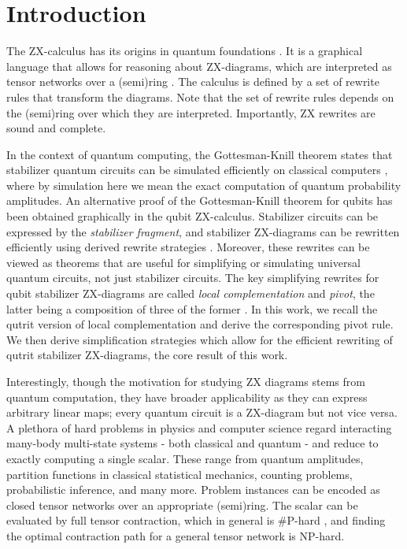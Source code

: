 \section{Introduction}



The ZX-calculus has its origins in
quantum foundations \cite{Coecke2011,vandewetering2020zxcalculus}.
It is a graphical language that allows for reasoning about ZX-diagrams,
which are interpreted as tensor networks over
a (semi)ring \cite{wang2020completeness}.
The calculus
is defined by a set of rewrite rules
that transform the diagrams.
Note that the set of rewrite rules depends on
the (semi)ring over which they are interpreted.
Importantly, ZX rewrites are sound and complete.


In the context of quantum computing,
the Gottesman-Knill theorem states that stabilizer quantum
circuits can be
simulated efficiently on classical computers \cite{Aaronson2004},
where by simulation here we mean the exact computation of quantum probability amplitudes.
An alternative
proof of the Gottesman-Knill theorem for qubits has been obtained graphically in the qubit ZX-calculus.
Stabilizer circuits can be expressed by the \emph{stabilizer
fragment},
and stabilizer ZX-diagrams can be rewritten efficiently
using derived rewrite strategies \cite{graph_theoretic_simplification}.
Moreover, these rewrites can be viewed as theorems
that are useful for simplifying or simulating universal quantum circuits, not just stabilizer circuits.
The key simplifying rewrites
for qubit stabilizer ZX-diagrams
are called \emph{local complementation} and \emph{pivot},
the latter being a composition of three of the former \cite{graph_theoretic_simplification}.
In this work, we recall the qutrit version of local complementation \cite{harny_completeness} and derive the corresponding pivot rule.
We then derive simplification strategies
which allow for the efficient rewriting of qutrit stabilizer ZX-diagrams,
the core result of this work.

Interestingly, though the motivation for studying ZX diagrams stems from quantum computation, they have broader applicability as they
can express arbitrary linear maps;
every quantum circuit is a ZX-diagram but not vice versa.
A plethora of hard problems in physics and computer science
regard interacting many-body multi-state systems - both classical and quantum -
and reduce to exactly computing a single scalar.
These range from quantum amplitudes,
partition functions in classical statistical mechanics,
counting problems, probabilistic inference, and many more.
Problem instances can be encoded as closed
tensor networks over an appropriate (semi)ring.
The scalar can be evaluated by full tensor contraction,
which in general is \#P-hard \cite{Damm2002},
and finding the optimal contraction path for a general tensor network is NP-hard.


